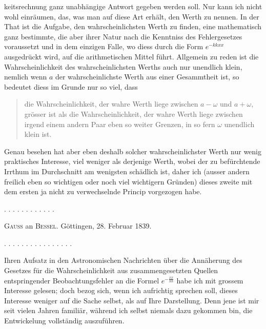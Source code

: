 keitsrechnung ganz unabhängige Antwort gegeben werden soll. Nur kann ich nicht wohl einräumen, das, was man auf diese Art erhält, den  Werth zu nennen. In der That ist die Aufgabe, den wahrscheinlichsten Werth zu finden, eine mathematisch ganz bestimmte, die aber ihrer Natur nach die Kenntniss des Fehlergesetzes voraussetzt und  in dem einzigen Falle, wo diess durch die Form $e^{-kkxx}$ ausgedrückt wird, auf die arithmetischen Mittel führt. Allgemein zu reden ist die Wahrscheinlichkeit des wahrscheinlichsten Werths auch nur unendlich klein, nemlich wenn $a$ der wahrscheinlichste Werth aus einer  Gesammtheit ist, so bedeutet diess im Grunde nur so viel, dass

\begin{quote}
die Wahrscheinlichkeit, der wahre Werth liege zwischen $a-\omega$ und $a+\omega$, grösser ist als die Wahrscheinlichkeit, der wahre Werth liege zwischen irgend einem andern Paar eben so weiter Grenzen, in so fern $\omega$ unendlich klein ist.
\end{quote}

Genau besehen hat aber eben deshalb solcher wahrscheinlichster Werth nur wenig praktisches Interesse, viel weniger als derjenige Werth, wobei der zu befürchtende Irrthum im Durchschnitt am wenigsten schädlich ist, daher ich (ausser andern freilich eben so wichtigen oder noch viel wichtigern Gründen) dieses zweite mit dem ersten ja nicht zu verwechselnde Princip vorgezogen habe.

. . . . . . . . . . . .

\begin{center}\textsc{Gauss} an \textsc{Bessel}. Göttingen, 28. Februar 1839.\end{center}

. . . . . . . . . . . . . . . .

Ihren Aufsatz in den Astronomischen Nachrichten über die Annäherung des Gesetzes für die Wahrscheinlichkeit aus zusammengesetzten Quellen entspringender Beobachtungsfehler an die Formel $e^{-\frac{xx}{hh}}$ habe ich mit grossem Interesse gelesen; doch bezog sich, wenn ich aufrichtig sprechen soll, dieses Interesse weniger auf die Sache selbst, als auf Ihre Darstellung. Denn jene ist mir seit vielen Jahren familiär, während ich selbst niemals dazu gekommen bin, die Entwickelung vollständig auszuführen.


